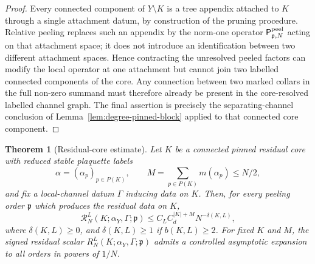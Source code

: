 \documentclass[11pt,a4paper,reqno]{amsart}
\newtheorem{theorem}{Theorem}[section]
\theoremstyle{definition}
\theoremstyle{remark}
\begin{document}
\begin{proof}
Every connected component of $Y\setminus K$ is a tree appendix attached to $K$ through a single attachment datum, by construction of the pruning procedure. Relative peeling replaces such an appendix by the norm-one operator $\mathsf P^{\rm peel}_{\mathfrak p,N}$ acting on that attachment space; it does not introduce an identification between two different attachment spaces. Hence contracting the unresolved peeled factors can modify the local operator at one attachment but cannot join two labelled connected components of the core. Any connection between two marked collars in the full non-zero summand must therefore already be present in the core-resolved labelled channel graph. The final assertion is precisely the separating-channel conclusion of Lemma~\ref{lem:degree-pinned-block} applied to that connected core component.
\end{proof}

\begin{theorem}[Residual-core estimate]\label{thm:core-plancherel}
Let $K$ be a connected pinned residual core with reduced stable plaquette labels
\[
\alpha=(\alpha_p)_{p\in P(K)},\qquad
M=\sum_{p\in P(K)}m(\alpha_p)\le N/2,
\]
and fix a local-channel datum $\Gamma$ inducing data on $K$.  Then, for every peeling order $\mathfrak p$ which produces the residual data on $K$,
\begin{equation}\label{eq:residual-core-bound}
\mathcal R_N^L(K;\alpha_Y,\Gamma;\mathfrak p)
\le C_L C_d^{|K|+M}N^{-\delta(K,L)},
\end{equation}
where $\delta(K,L)\ge0$, and $\delta(K,L)\ge1$ if $b(K,L)\ge2$.  For fixed $K$ and $M$, the signed residual scalar $R_N^L(K;\alpha_Y,\Gamma;\mathfrak p)$ admits a controlled asymptotic expansion to all orders in powers of $1/N$.
\end{theorem}
\end{document}
